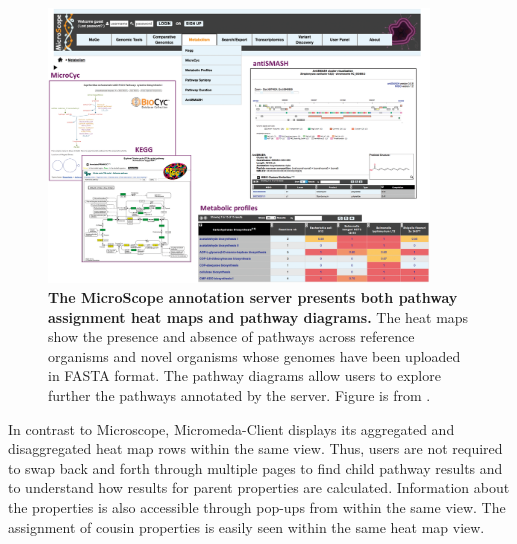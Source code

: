 \begin{figure}[!ht]
  \centering
	\includegraphics[width=0.9\textwidth]{media/microscope.png}
	 \caption[The MicroScope annotation server presents both pathway assignment 
heat maps and pathway diagrams.]{\textbf{The MicroScope annotation server 
presents both pathway assignment heat maps and pathway diagrams.} The heat maps 
show the presence and absence of pathways across reference organisms and novel 
organisms whose genomes have been uploaded in FASTA format. The pathway diagrams 
allow users to explore further the pathways annotated by the server. Figure is 
from \cite{vallenet2016microscope}.}
	 \label{fig:microscope}
\end{figure}

In contrast to Microscope, Micromeda-Client displays its aggregated and 
disaggregated heat map rows within the same view. Thus, users are not required 
to swap back and forth through multiple pages to find child pathway results and 
to understand how results for parent properties are calculated. Information 
about the properties is also accessible through pop-ups from within the same 
view. The assignment of cousin properties is easily seen within the same heat 
map view.

